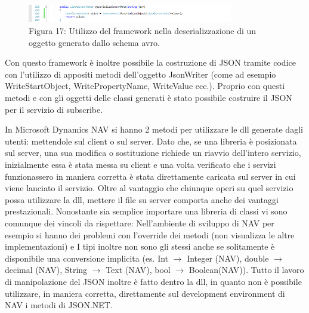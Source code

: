 \begin{figure}[h]
	\centering
	\includegraphics[width=0.8\textwidth]{deserialize.png}
	\caption*{Figura 17: Utilizzo del framework nella deserializzazione di un oggetto generato dallo schema avro.}
\end{figure}

Con questo framework è inoltre possibile la costruzione di JSON tramite codice con l’utilizzo di appositi metodi dell’oggetto JsonWriter (come ad esempio WriteStartObject, WritePropertyName, WriteValue ecc.). Proprio con questi metodi e con gli oggetti delle classi generati è stato possibile costruire il JSON per il servizio di subscribe.

In Microsoft Dynamics NAV si hanno 2 metodi per utilizzare le dll generate dagli utenti: mettendole sul client o sul server. Dato che, se una libreria è posizionata sul server, una sua modifica o sostituzione richiede un riavvio dell’intero servizio, inizialmente essa è stata messa su client e una volta verificato che i servizi funzionassero in maniera corretta è stata direttamente caricata sul server in cui viene lanciato il servizio. Oltre al vantaggio che chiunque operi su quel servizio possa utilizzare la dll, mettere il file su server comporta anche dei vantaggi prestazionali. Nonostante sia semplice importare una libreria di classi vi sono comunque dei vincoli da rispettare: Nell’ambiente di sviluppo di NAV per esempio si hanno dei problemi con l’override dei metodi (non visualizza le altre implementazioni) e I tipi inoltre non sono gli stessi anche se solitamente è disponibile una conversione implicita (es. Int $\rightarrow$ Integer (NAV), double $\rightarrow$ decimal (NAV), String $\rightarrow$ Text (NAV), bool $\rightarrow$ Boolean(NAV)). Tutto il lavoro di manipolazione del JSON inoltre è fatto dentro la dll, in quanto non è possibile utilizzare, in maniera corretta, direttamente sul development environment di NAV i metodi di JSON.NET.

